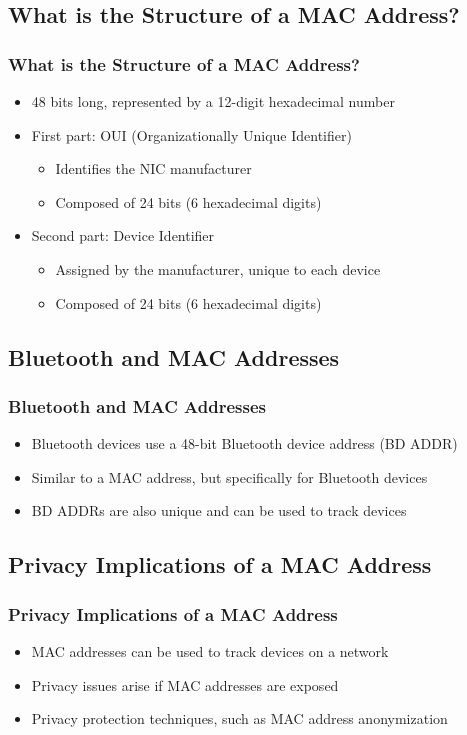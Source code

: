 \documentclass[
	11pt, %
]{beamer}
\begin{document}
\begin{frame}
  \section{What is the Structure of a MAC Address?}
  \frametitle{What is the Structure of a MAC Address?}
  \begin{itemize}
    \item 48 bits long, represented by a 12-digit hexadecimal number \pause
    \item First part: OUI (Organizationally Unique Identifier) \pause
      \begin{itemize}
        \item Identifies the NIC manufacturer \pause
        \item Composed of 24 bits (6 hexadecimal digits) \pause
      \end{itemize}
    \item Second part: Device Identifier \pause
      \begin{itemize}
        \item Assigned by the manufacturer, unique to each device \pause
        \item Composed of 24 bits (6 hexadecimal digits) 
      \end{itemize}
  \end{itemize}
\end{frame}

\begin{frame}
  \section{Bluetooth and MAC Addresses}
  \frametitle{Bluetooth and MAC Addresses}
  \begin{itemize}
    \item Bluetooth devices use a 48-bit Bluetooth device address (BD ADDR) \pause
    \item Similar to a MAC address, but specifically for Bluetooth devices \pause
    \item BD ADDRs are also unique and can be used to track devices 
  \end{itemize}
\end{frame}

\begin{frame}
  \section{Privacy Implications of a MAC Address}
  \frametitle{Privacy Implications of a MAC Address}
  \begin{itemize}
    \item MAC addresses can be used to track devices on a network \pause
    \item Privacy issues arise if MAC addresses are exposed \pause
    \item Privacy protection techniques, such as MAC address anonymization 
  \end{itemize}
\end{frame}
\end{document}

